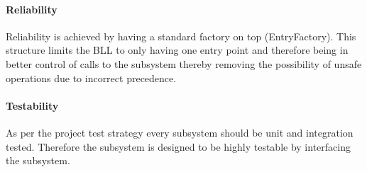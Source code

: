 \documentclass[../report.tex]{subfiles}
\begin{document}





\paragraph{Reliability}
Reliability is achieved by having a standard factory on top (EntryFactory). This structure limits the BLL to only having one entry point and therefore being in better control of calls to the subsystem thereby removing the possibility of unsafe operations due to incorrect precedence. 





\paragraph{Testability}
As per the project test strategy every subsystem should be unit and integration tested. Therefore the subsystem is designed to be highly testable by interfacing the subsystem. 
\end{document}
